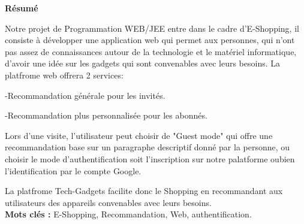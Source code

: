 \renewcommand{\abstractnamefont}{\normalfont\LARGE\bfseries}


\newpage
{}
\LARGE
	\begin{center}
	\textbf{ Résumé}
	\end{center}
\begin{spacing}{1.3}
Notre projet de Programmation WEB/JEE entre dans le cadre d'E-Shopping, il consiste à développer une application web qui permet aux personnes, qui n'ont pas assez de connaissances autour de la technologie et le matériel informatique, d'avoir une idée sur les gadgets qui sont convenables avec leurs besoins. 
La platfrome web offrera 2 services:

-Recommandation générale pour les invités.

-Recommandation plus personnalisée pour les abonnés.

Lors d’une visite, l'utilisateur peut choisir de "Guest mode" qui offre une recommandation base sur un paragraphe descriptif donné par la personne, ou choisir le mode d'authentification soit l'inscription sur notre palatforme oubien l'identification par le compte Google.


La platfrome Tech-Gadgets facilite donc le Shopping en recommandant aux utilisateurs des appareils convenables avec leurs besoins.
\\

\textbf{Mots clés :} E-Shopping, Recommandation, Web, authentification.

\end{spacing}    

\newpage

